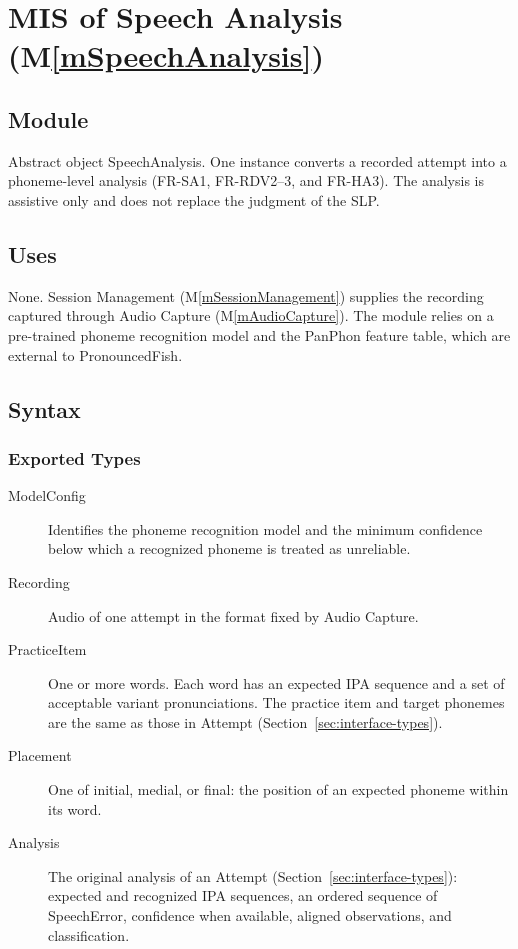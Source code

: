 \documentclass[12pt, titlepage]{article}
\newcommand{\mref}[1]{M\ref{#1}}
\begin{document}
\clearpage

\section{MIS of Speech Analysis (\mref{mSpeechAnalysis})} \label{mis:analysis}

\subsection{Module}
Abstract object SpeechAnalysis. One instance converts a recorded attempt into
a phoneme-level analysis (FR-SA1, FR-RDV2--3, and FR-HA3). The analysis is
assistive only and does not replace the judgment of the SLP.

\subsection{Uses}
None. Session Management (\mref{mSessionManagement}) supplies the recording
captured through Audio Capture (\mref{mAudioCapture}). The module relies on a
pre-trained phoneme recognition model and the PanPhon feature table, which are
external to PronouncedFish.

\subsection{Syntax}

\subsubsection{Exported Types}
\begin{description}
\item[ModelConfig] Identifies the phoneme recognition model and the minimum
confidence below which a recognized phoneme is treated as unreliable.
\item[Recording] Audio of one attempt in the format fixed by Audio Capture.
\item[PracticeItem] One or more words. Each word has an expected IPA sequence
and a set of acceptable variant pronunciations. The practice item and target
phonemes are the same as those in Attempt
(Section~\ref{sec:interface-types}).
\item[Placement] One of initial, medial, or final: the position of an expected
phoneme within its word.
\item[Analysis] The original analysis of an Attempt
(Section~\ref{sec:interface-types}): expected and recognized IPA sequences, an
ordered sequence of SpeechError, confidence when available, aligned
observations, and classification.
\end{description}
\end{document}
